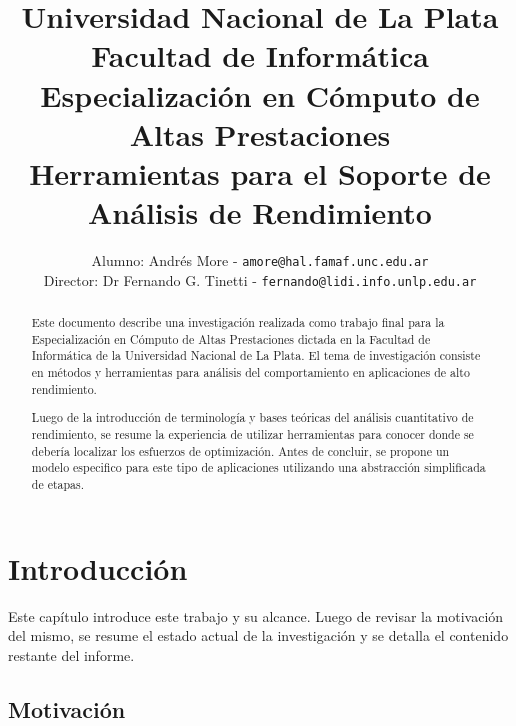 \documentclass[a4paper]{report}
\begin{document}
\title{
  Universidad Nacional de La Plata\\Facultad de Inform\'atica\\
  \bigskip
  Especializaci\'on en C\'omputo de Altas Prestaciones\\
  \bigskip
  Herramientas para el Soporte de An\'alisis de Rendimiento
}

\author{
  Alumno: Andr\'es More - {\tt amore@hal.famaf.unc.edu.ar}\\
  Director: Dr Fernando G. Tinetti - {\tt fernando@lidi.info.unlp.edu.ar}
}


\maketitle

\begin{abstract}

  \bigskip

  Este documento describe una investigaci\'on realizada como trabajo final para
  la Especializaci\'on en C\'omputo de Altas Prestaciones dictada en la Facultad
  de Inform\'atica de la Universidad Nacional de La Plata.
  El tema de investigaci\'on consiste en m\'etodos y herramientas para an\'alisis del comportamiento
  en aplicaciones de alto rendimiento.

  \bigskip

  Luego de la introducci\'on de terminolog\'ia y bases te\'oricas del an\'alisis cuantitativo
  de rendimiento, se resume la experiencia de utilizar herramientas para conocer donde
  se deber\'ia localizar los esfuerzos de optimizaci\'on.
  Antes de concluir, se propone un modelo especifico para este tipo de aplicaciones utilizando
  una abstracci\'on simplificada de etapas.

\end{abstract}

\tableofcontents

\chapter{Introducci\'on}

Este cap\'itulo introduce este trabajo y su alcance. Luego de revisar la motivaci\'on del mismo,
se resume el estado actual de la investigaci\'on y se detalla el contenido restante
del informe.

\section{Motivaci\'on}
\end{document}
